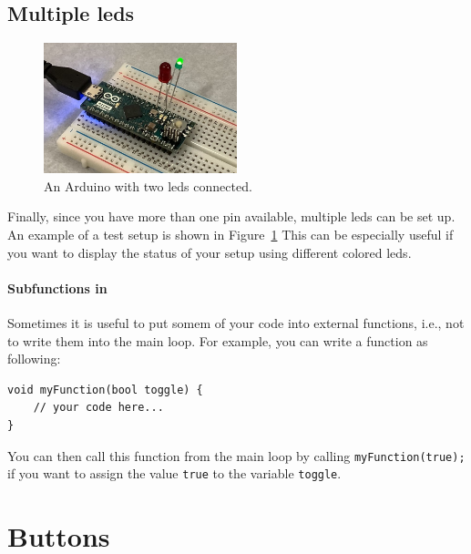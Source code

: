 \subsection{Multiple \acp{led}}

\begin{figure}[tb]
    \centering
    \includegraphics[width=0.5\textwidth]{graphics/01_blink/arduino_two_leds.jpg}
    \caption{An Arduino with two \acp{led} connected.}
    \label{fig:blink:arduino_two_leds}
\end{figure}
Finally, since you have more than one pin available, multiple \acp{led} can be set up. An example of a test setup is shown in Figure~\ref{fig:blink:arduino_two_leds} This can be especially useful if you want to display the status of your setup using different colored \acp{led}.

\paragraph{Subfunctions in \cpp} Sometimes it is useful to put somem of your code into external functions, i.e., not to write them into the main loop. For example, you can write a function as following:

\begin{lstlisting}
void myFunction(bool toggle) {
    // your code here...
}
\end{lstlisting}
You can then call this function from the main loop by calling \lstinline{myFunction(true);} if you want to assign the value \lstinline{true} to the variable \lstinline{toggle}.


\section{Buttons}


